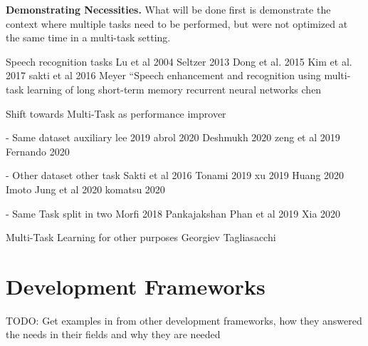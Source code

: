 \textbf{Demonstrating Necessities.} What will be done first is demonstrate the context where multiple tasks need to be performed, but were not optimized at the same time in a multi-task setting.  

Speech recognition tasks
Lu et al 2004
Seltzer 2013
Dong et al. 2015
Kim et al. 2017
sakti et al 2016
Meyer
“Speech enhancement
and recognition using multi-task learning of long short-term memory recurrent neural networks chen


Shift towards Multi-Task as performance improver

- Same dataset auxiliary
lee 2019
abrol 2020
Deshmukh 2020
zeng et al 2019
Fernando 2020


- Other dataset other task
Sakti et al 2016
Tonami 2019
xu 2019
Huang 2020
Imoto
Jung et al 2020
komatsu 2020


- Same Task split in two
Morfi 2018
Pankajakshan
Phan et al 2019
Xia 2020


Multi-Task Learning for other purposes
Georgiev
Tagliasacchi




\section{Development Frameworks}
TODO: Get examples in from other development frameworks, how they answered the needs in their fields and why they are needed